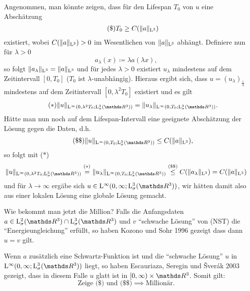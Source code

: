 Angenommen, man könnte zeigen, dass für den Lifespan $T_0$ von $u$ eine Abschätzung
\begin{align*}
  \tag{\$} T_0 \geq C(\|a\|_{\mathrm{L}^3})
\end{align*}
existiert, wobei $C(\|a\|_{\mathrm{L}^3}) > 0$ im Wesentlichen von $\|a\|_{\mathrm{L}^3}$ abhängt.
Definiere nun für $\lambda > 0$
$$
a_\lambda(x) \coloneqq \lambda a(\lambda x),
$$
so folgt $\|a_\lambda\|_{\mathrm{L}^3} = \|a\|_{\mathrm{L}^3}$ und für jedes $\lambda > 0$ existiert $u_\lambda$ mindestens auf dem Zeitintervall $[0,T_0]$ ($T_0$ ist $\lambda$-unabhängig).
Hieraus ergibt sich, dass $u = (u_\lambda)_{\frac{1}{\lambda}}$ mindestens auf dem Zeitintervall $[0,\lambda^2 T_0]$ existiert und es gilt
\begin{align*}
  \tag{$\ast$} \|u\|_{\Ell^\infty(0,\lambda^2 T_0; \Ell^3_\sigma(\R^3))} = \|u_\lambda\|_{\Ell^\infty(0,T_0; \Ell^3_\sigma(\R^3))}.
\end{align*} 
Hätte man nun noch auf dem Lifespan-Intervall eine geeignete Abschätzung der Lösung gegen die Daten, d.h.
\begin{align*}
  \tag{\$\$} \|u\|_{\Ell^\infty(0,T_0; \Ell^3_\sigma(\R^3))} \leq C(\|a\|_{\Ell^3}),
\end{align*}
so folgt mit ($\ast$)
$$
\|u\|_{\Ell^\infty(0,\lambda^2 T_0; \Ell^3_\sigma(\R^3))}
\overset{\text{($\ast$)}}{=\vphantom{\leq}\!\!} \|u_\lambda\|_{\Ell^\infty(0,T_0; \Ell^3_\sigma(\R^3))}
\overset{\text{(\$\$)}}{\leq} C(\|a_\lambda\|_{\Ell^3}) = C(\|a\|_{\Ell^3})
$$
und für $\lambda \to \infty$ ergäbe sich $u \in \Ell^\infty(0,\infty; \Ell^3_\sigma(\R^3))$, wir hätten damit also aus einer lokalen Lösung eine globale Lösung gemacht.

Wie bekommt man jetzt die Million?
Falls die Anfangsdaten $a \in \Ell^2_\sigma(\R^3) \cap \Ell^3_\sigma(\R^3)$ und $v$ ``schwache Lösung'' von (NST) die ``Energieungleichung'' erfüllt, so haben Kozono und Sohr 1996 gezeigt dass dann $u = v$ gilt.

Wenn $a$ zusätzlich eine Schwartz-Funktion ist und die ``schwache Lösung'' $u$ in $\Ell^\infty(0,\infty; \Ell^3_\sigma(\R^3))$ liegt, so haben Escauriaza, Seregin und \v{S}ver\'ak 2003 gezeigt, dass in diesem Falle $u$ glatt ist in $[0,\infty) \times \R^3$. Somit gilt:
$$
\text{Zeige (\$) und (\$\$)} \implies \text{Millionär}.
$$


